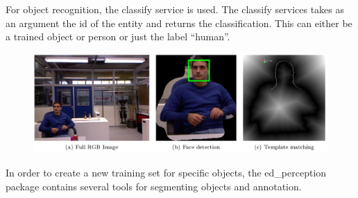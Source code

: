 For object recognition, the classify service is used. The classify services takes as an argument the id of the entity and returns the classification. This can either be a trained object or person or just the label “human”.
\begin{figure}[ht]
	\includegraphics[width = \linewidth]{Figures/ed_perception_people}
	\label{fig:ed_perception_people}
\end{figure}
In order to create a new training set for specific objects, the ed\_perception package contains several tools for segmenting objects and annotation. 
